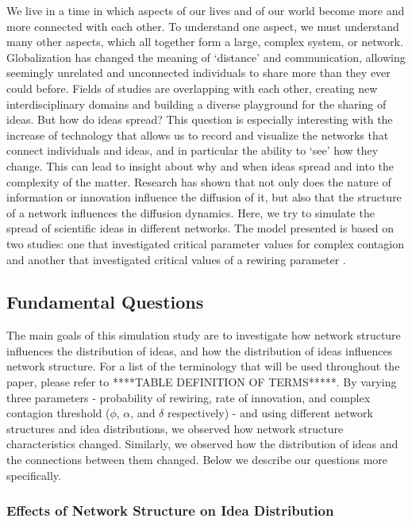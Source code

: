 
We live in a time in which aspects of our lives and of our world become more and more connected with each other. To understand one aspect, we must understand many other aspects, which all together form a large, complex system, or network. Globalization has changed the meaning of `distance' and communication, allowing seemingly unrelated and unconnected individuals to share more than they ever could before. Fields of studies are overlapping with each other, creating new interdisciplinary domains and building a diverse playground for the sharing of ideas. But how do ideas spread? This question is especially interesting with the increase of technology that allows us to record and visualize the networks that connect individuals and ideas, and in particular the ability to `see' how they change. This can lead to insight about why and when ideas spread and into the complexity of the matter. Research has shown that not only does the nature of information or innovation influence the diffusion of it, but also that the structure of a network influences the diffusion dynamics. Here, we try to simulate the spread of scientific ideas in different networks. The model presented is based on two studies: one that investigated critical parameter values for complex contagion \citep{CM2007} and another that investigated critical values of a rewiring parameter \citep{HN2006}.

\subsection{Fundamental Questions}

The main goals of this simulation study are to investigate how network structure influences the distribution of ideas, and how the distribution of ideas influences network structure. For a list of the terminology that will be used throughout the paper, please refer to ****TABLE DEFINITION OF TERMS*****. By varying three parameters - probability of rewiring, rate of innovation, and complex contagion threshold ($\phi$, $\alpha$, and $\delta$ respectively) - and using different network structures and idea distributions, we observed how network structure characteristics changed. Similarly, we observed how the distribution of ideas and the connections between them changed. Below we describe our questions more specifically.


\subsubsection{Effects of Network Structure on Idea Distribution}

